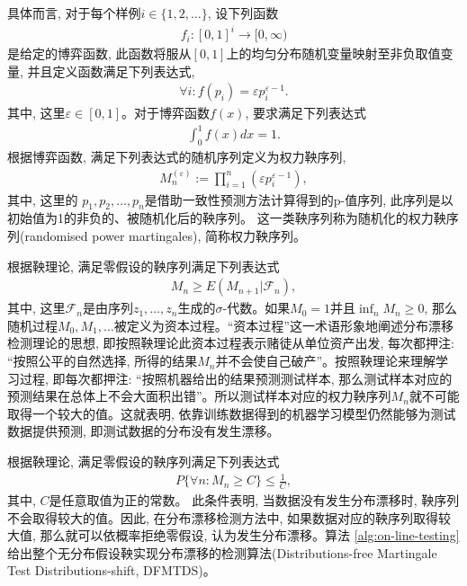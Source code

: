 具体而言, 对于每个样例$i \in \{1,2,\ldots\}$, 设下列函数
\begin{align}
f_i : [0,1]^{i} \rightarrow [0, \infty)
\end{align}
是给定的博弈函数, 此函数将服从$[0,1]$上的均匀分布随机变量映射至非负取值变量, 并且定义函数满足下列表达式,
\begin{align}
\label{betting}
\forall i: f(p_i) = \varepsilon p_{i}^{\varepsilon -1}.
\end{align}
其中, 这里$\varepsilon \in [0,1]$。对于博弈函数$f(x)$, 要求满足下列表达式
\begin{align}
\int_{0}^{1}f(x)dx=1.
\end{align}
根据博弈函数, 满足下列表达式的随机序列定义为权力鞅序列, 
\begin{align}
M_{n}^{(\varepsilon)} := \prod_{i=1}^{n}(\varepsilon p_{i}^{\varepsilon - 1}),
\end{align}
其中, 这里的 $p_1, p_2, \ldots, p_n$是借助一致性预测方法计算得到的p-值序列, 此序列是以初始值为1的非负的、被随机化后的鞅序列。 这一类鞅序列称为随机化的权力鞅序列(randomised power martingales), 简称权力鞅序列。

根据鞅理论\citep{Ville1939,Doob1984}, 满足零假设的鞅序列满足下列表达式
\begin{align}
\label{alpha-4.7}
M_{n} \geq E(M_{n+1} | \mathcal{F}_{n}),
\end{align}
其中, 这里$\mathcal{F}_{n}$是由序列$z_{1}, \ldots, z_{n}$生成的$\sigma$-代数。如果$M_{0}=1$并且$\inf_{n}M_{n} \geq 0$, 那么随机过程$M_{0}, M_{1}, \ldots$被定义为资本过程\citep{Vovk1993,vovk2001,vovk2021,Bienvenu2022,Laurent2009,Bienvenu2009OnTH}。“资本过程”这一术语形象地阐述分布漂移检测理论的思想, 即按照鞅理论此资本过程表示赌徒从单位资产出发, 每次都押注: “按照公平的自然选择, 所得的结果$M_{n}$并不会使自己破产”。按照鞅理论来理解学习过程, 即每次都押注: “按照机器给出的结果预测测试样本, 那么测试样本对应的预测结果在总体上不会大面积出错”。所以测试样本对应的权力鞅序列$M_{n}$就不可能取得一个较大的值。这就表明, 依靠训练数据得到的机器学习模型仍然能够为测试数据提供预测, 即测试数据的分布没有发生漂移。

根据鞅理论\citep{Ville1939,Doob1984}, 满足零假设的鞅序列满足下列表达式
\begin{align}
\label{martingale-C}
P\{\forall n: M_{n} \geq C\} \leq \frac{1}{C},
\end{align}
其中, $C$是任意取值为正的常数。 此条件表明, 当数据没有发生分布漂移时, 鞅序列不会取得较大的值。因此, 在分布漂移检测方法中, 如果数据对应的鞅序列取得较大值, 那么就可以依概率拒绝零假设, 认为发生分布漂移。算法 \ref{alg:on-line-testing} 给出整个无分布假设鞅实现分布漂移的检测算法(Distributions-free Martingale Test Distributions-shift, DFMTDS)。

